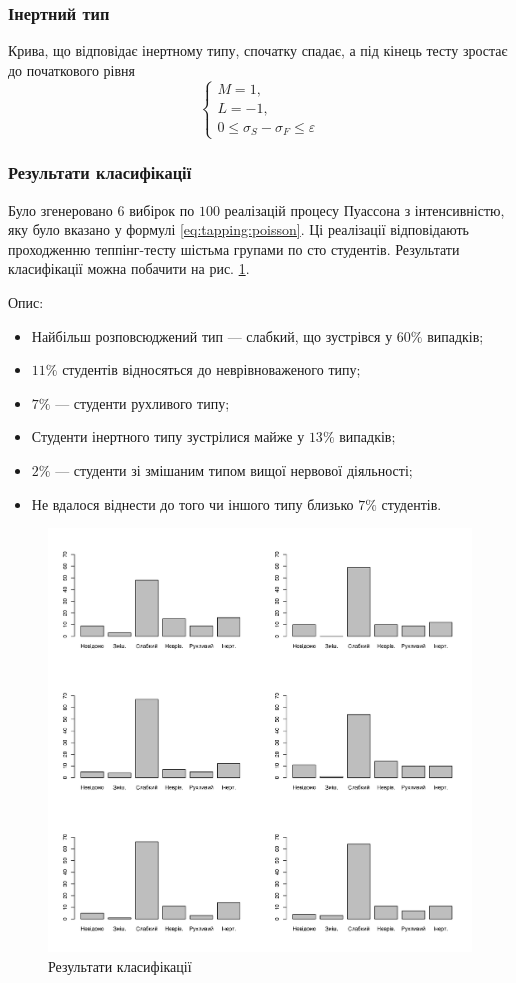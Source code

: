 \subsubsection{Інертний тип}
Крива, що відповідає інертному типу, спочатку спадає,
а під кінець тесту зростає до початкового рівня
\begin{equation*}
  \begin{cases}
    M = 1, \\
    L = -1, \\
    0 \le \sigma_S - \sigma_F \le \varepsilon
  \end{cases}
\end{equation*}

\subsubsection{Результати класифікації}
Було згенеровано $6$ вибірок по $100$ реалізацій процесу Пуассона з
інтенсивністю, яку було вказано у формулі \eqref{eq:tapping:poisson}.
Ці реалізації відповідають проходженню теппінг-тесту шістьма групами по сто
студентів.
Результати класифікації можна побачити на рис. \ref{fig:tapping:poisson:types}.

Опис:
\begin{itemize}
  \item
    Найбільш розповсюджений тип --- слабкий, що зустрівся у $60\%$
    випадків;
  \item
    $11\%$ студентів відносяться до неврівноваженого типу;
  \item
    $7\%$ --- студенти рухливого типу;
  \item
    Студенти інертного типу зустрілися майже у $13\%$ випадків;
  \item
    $2\%$ --- студенти зі змішаним типом вищої нервової діяльності;
  \item
    Не вдалося віднести до того чи іншого типу близько $7\%$ студентів.
\end{itemize}

\begin{figure}[h]
  \centering
  \includegraphics[width=\textwidth]{images/poisson_types}
  \caption{Результати класифікації}
  \label{fig:tapping:poisson:types}
\end{figure}
